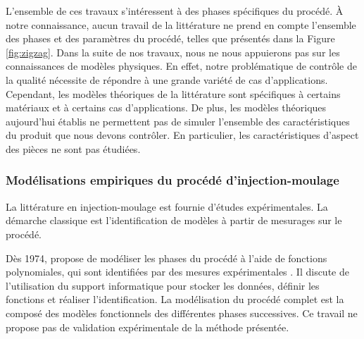 L'ensemble de ces travaux s'intéressent à des phases spécifiques du procédé.
À notre connaissance, aucun travail de la littérature ne prend en compte l'ensemble des phases et des paramètres du procédé, telles que présentés dans la Figure \ref{fig:zigzag}.
Dans la suite de nos travaux, nous ne nous appuierons pas sur les connaissances de modèles physiques.
En effet, notre problématique de contrôle de la qualité nécessite de répondre à une grande variété de cas d'applications.
Cependant, les modèles théoriques de la littérature sont spécifiques à certains matériaux et à certains cas d'applications.
De plus, les modèles théoriques aujourd'hui établis ne permettent pas de simuler l'ensemble des caractéristiques du produit que nous devons contrôler.
En particulier, les caractéristiques d'aspect des pièces ne sont pas étudiées.

\subsubsection{Modélisations empiriques du procédé d'injection-moulage}
La littérature en injection-moulage est fournie d'études expérimentales.
La démarche classique est l'identification de modèles à partir de mesurages sur le procédé.

Dès 1974, \citeauthor{ma_design_1974} propose de modéliser les phases du procédé à l'aide de fonctions polynomiales, qui sont identifiées par des mesures expérimentales \cite{ma_design_1974}.
Il discute de l'utilisation du support informatique pour stocker les données, définir les fonctions et réaliser l'identification.
La modélisation du procédé complet est la composé des modèles fonctionnels des différentes phases successives.
Ce travail ne propose pas de validation expérimentale de la méthode présentée.

